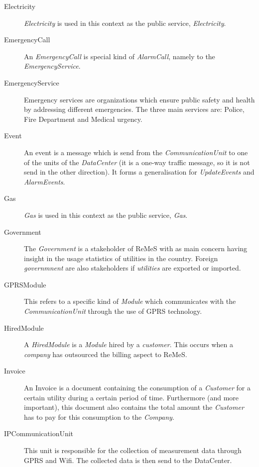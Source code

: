 \begin{description}
\item[Electricity] \emph{Electricity} is used in this context as the public
service, \emph{Electricity}.

\item[EmergencyCall] An \emph{EmergencyCall} is special kind of
\emph{AlarmCall}, namely to the \emph{EmergencyService}.

\item[EmergencyService] Emergency services are organizations which ensure public
safety and health by addressing different emergencies. The three main services
are: Police, Fire Department and Medical urgency.

\item[Event] An event is a message which is send from the
\emph{CommunicationUnit} to one of the units of the \emph{DataCenter} (it is a
one-way traffic message, so it is not send in the other direction). It forms a
generalisation for \emph{UpdateEvents} and \emph{AlarmEvents}.

\item[Gas] \emph{Gas} is used in this context as the public service,
\emph{Gas}.

\item[Government] The \emph{Government} is a stakeholder of ReMeS with as main
concern having insight in the usage statistics of utilities in the country.
Foreign \emph{governmnent} are also stakeholders if \emph{utilities} are
exported or imported.

\item[GPRSModule] This refers to a specific kind of \emph{Module} which
communicates with the \emph{CommunicationUnit} through the use of GPRS
technology.

\item[HiredModule] A \emph{HiredModule} is a \emph{Module} hired by a
\emph{customer}. This occurs when a \emph{company} has outsourced the billing
aspect to ReMeS.

\item[Invoice] An Invoice is a document containing the consumption of a
\emph{Customer} for a certain utility during a certain period of time.
Furthermore (and more important), this document also contains the total amount
the \emph{Customer} has to pay for this consumption to the \emph{Company}.

\item[IPCommunicationUnit] This unit is responsible for the collection of
measurement data through GPRS and Wifi. The collected data is then send to the
DataCenter.


\end{description}
